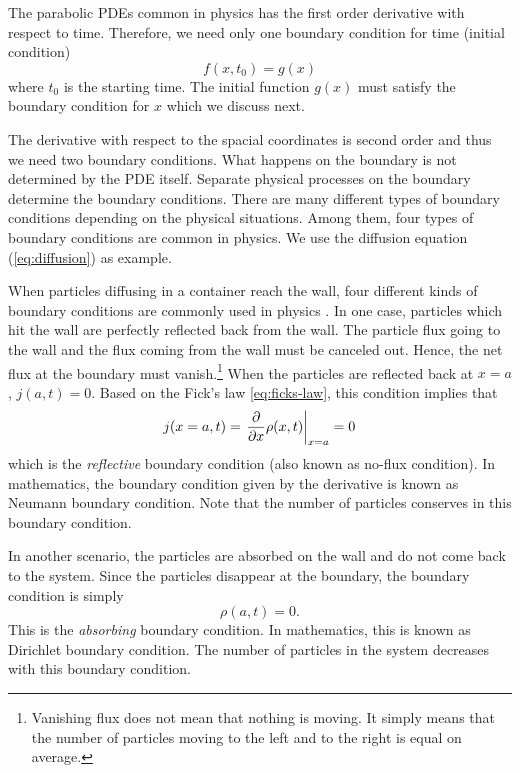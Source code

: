 The parabolic PDEs common in physics has the first order derivative with respect to time.
Therefore, we need only one boundary condition for time (initial condition)
\begin{equation}\label{eq:pde_initial_condition}
f(x,t_0) = g(x)
\end{equation}
where $t_0$ is the starting time.  The initial function $g(x)$ must satisfy the boundary condition for $x$ which we discuss next.

The derivative with respect to the spacial coordinates is second order and thus we need two boundary conditions.
What happens on the boundary is not determined by the PDE itself.  Separate physical processes on the boundary determine the boundary conditions.
There are many different types of boundary conditions depending on the physical situations. Among them, four types of boundary conditions are common in physics.  We use the diffusion equation (\ref{eq:diffusion}) as example.

When particles diffusing in a container reach the wall, four different kinds of boundary conditions are commonly used in physics .
In one case, particles which hit the wall are perfectly reflected back from the wall.  The particle flux going to the wall and the flux coming from the wall must be canceled out.  Hence, the net flux at the boundary must vanish.\footnote{Vanishing flux does not mean that nothing is moving.  It simply means that the number of particles moving to the left and to the right is equal on average.}  When the particles are reflected back at $x=a$, $j(a,t)=0$.  Based on the Fick's law \eqref{eq:ficks-law}, this condition implies that
\begin{equation}\label{eq:pde_neumann_boundary}
j(x=a,t)=\eval{\pdv{x} \rho(x,t)}_{x=a} = 0
\end{equation}
which is the \textit{reflective} boundary condition (also known as no-flux condition).  In mathematics, the boundary condition given by the derivative is known as Neumann boundary condition.  Note that the number of particles conserves in this boundary condition. 

In another scenario, the particles are absorbed on the wall and do not come back to the system.  Since the particles disappear at the boundary, the boundary condition is simply
\begin{equation}\label{eq:pde_dirichlet_boundary}
\rho(a,t)=0.
\end{equation}
This is the \textit{absorbing} boundary condition.  In mathematics, this is known as 
Dirichlet boundary condition.  The number of particles in the system decreases with this boundary condition.

